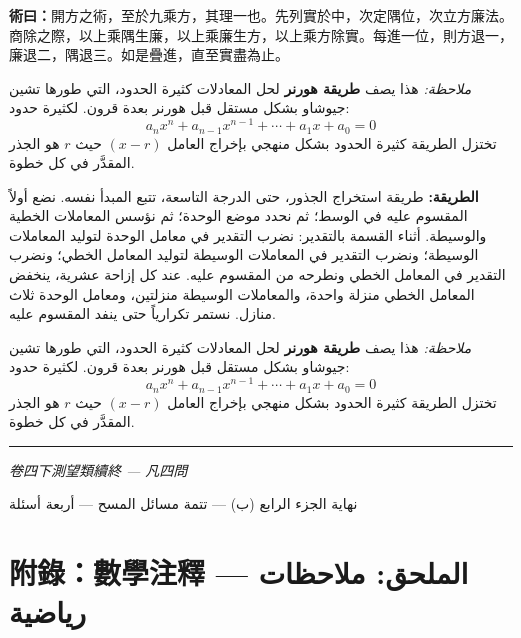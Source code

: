 \documentclass[11pt,a4paper]{article}
\newcommand{\ar}[1]{\arabicfont\beginR #1\endR}
\newcommand{\longline}{\noindent\rule{\textwidth}{0.4pt}}
\newcommand{\working}[2]{\par\noindent%
  \begin{minipage}[t]{0.48\textwidth}\textbf{術曰：}#1\end{minipage}%
  \hfill%
  \begin{minipage}[t]{0.48\textwidth}\arabicfont\beginR\textbf{الطريقة:} #2\endR\end{minipage}\par\vspace{0.2cm}}
\begin{document}
\working{開方之術，至於九乘方，其理一也。先列實於中，次定隅位，次立方廉法。商除之際，以上乘隅生廉，以上乘廉生方，以上乘方除實。每進一位，則方退一，廉退二，隅退三。如是疊進，直至實盡為止。

\medskip
\textit{ملاحظة:} هذا يصف \textbf{طريقة هورنر} لحل المعادلات كثيرة الحدود، التي طورها تشين جيوشاو بشكل مستقل قبل هورنر بعدة قرون. لكثيرة حدود:
\[
a_n x^n + a_{n-1} x^{n-1} + \cdots + a_1 x + a_0 = 0
\]
تختزل الطريقة كثيرة الحدود بشكل منهجي بإخراج العامل $(x - r)$ حيث $r$ هو الجذر المقدَّر في كل خطوة.}{طريقة استخراج الجذور، حتى الدرجة التاسعة، تتبع المبدأ نفسه. نضع أولاً المقسوم عليه في الوسط؛ ثم نحدد موضع الوحدة؛ ثم نؤسس المعاملات الخطية والوسيطة. أثناء القسمة بالتقدير: نضرب التقدير في معامل الوحدة لتوليد المعاملات الوسيطة؛ ونضرب التقدير في المعاملات الوسيطة لتوليد المعامل الخطي؛ ونضرب التقدير في المعامل الخطي ونطرحه من المقسوم عليه. عند كل إزاحة عشرية، ينخفض المعامل الخطي منزلة واحدة، والمعاملات الوسيطة منزلتين، ومعامل الوحدة ثلاث منازل. نستمر تكرارياً حتى ينفد المقسوم عليه.

\medskip
\textit{ملاحظة:} هذا يصف \textbf{طريقة هورنر} لحل المعادلات كثيرة الحدود، التي طورها تشين جيوشاو بشكل مستقل قبل هورنر بعدة قرون. لكثيرة حدود:
\[
a_n x^n + a_{n-1} x^{n-1} + \cdots + a_1 x + a_0 = 0
\]
تختزل الطريقة كثيرة الحدود بشكل منهجي بإخراج العامل $(x - r)$ حيث $r$ هو الجذر المقدَّر في كل خطوة.}


\vspace{0.5cm}
\longline
\begin{center}
\textit{卷四下測望類續終 --- 凡四問}

\vspace{0.2cm}

{\arabicfont\beginR نهاية الجزء الرابع (ب) --- تتمة مسائل المسح --- أربعة أسئلة\endR}
\end{center}

\newpage

\section*{附錄：數學注釋 --- \ar{الملحق: ملاحظات رياضية}}
\end{document}
